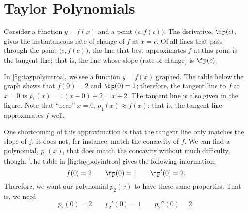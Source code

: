 \section{Taylor Polynomials}\label{sec:taylor_poly}

Consider a function $y=f(x)$ and a point $\bigl(c,f(c)\bigr)$. The derivative, $\fp(c)$, gives the instantaneous rate of change of $f$ at $x=c$. Of all lines that pass through the point $\bigl(c,f(c)\bigr)$, the line that best approximates $f$ at this point is the tangent line; that is, the line whose slope (rate of change) is $\fp(c)$.


In \autoref{fig:taypolyintroa}, we see a function $y=f(x)$ graphed. The table below the graph shows that $f(0)=2$ and $\fp(0) = 1$; therefore, the tangent line to $f$ at $x=0$ is $p_1(x) = 1(x-0)+2 = x+2$. The tangent line is also given in the figure. Note that ``near'' $x=0$, $p_1(x) \approx f(x)$; that is, the tangent line approximates $f$ well.

One shortcoming of this approximation is that the tangent line only matches the slope of $f$; it does not, for instance, match the concavity of $f$. We can find a polynomial, $p_2(x)$, that does match the concavity without much difficulty, though. The table in \autoref{fig:taypolyintroa} gives the following information:
\[f(0) = 2 \qquad \fp(0) = 1\qquad \fp'(0) = 2.\]
Therefore, we want our polynomial $p_2(x)$ to have these same properties. That is, we need
\[p_2(0) = 2 \qquad p_2'(0) = 1 \qquad p_2''(0) = 2.\]

